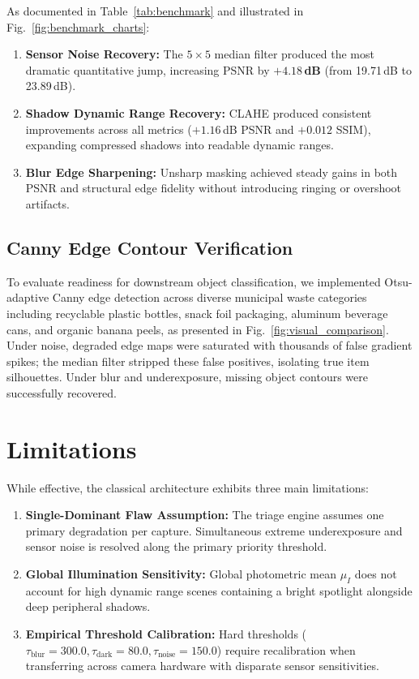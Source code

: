 \documentclass[conference]{IEEEtran}
\begin{document}
As documented in Table~\ref{tab:benchmark} and illustrated in Fig.~\ref{fig:benchmark_charts}:
\begin{enumerate}
    \item \textbf{Sensor Noise Recovery:} The $5 \times 5$ median filter produced the most dramatic quantitative jump, increasing PSNR by \textbf{$+4.18$\,dB} (from 19.71\,dB to 23.89\,dB).
    \item \textbf{Shadow Dynamic Range Recovery:} CLAHE produced consistent improvements across all metrics ($+1.16$\,dB PSNR and $+0.012$ SSIM), expanding compressed shadows into readable dynamic ranges.
    \item \textbf{Blur Edge Sharpening:} Unsharp masking achieved steady gains in both PSNR and structural edge fidelity without introducing ringing or overshoot artifacts.
\end{enumerate}

\subsection{Canny Edge Contour Verification}
To evaluate readiness for downstream object classification, we implemented Otsu-adaptive Canny edge detection across diverse municipal waste categories including recyclable plastic bottles, snack foil packaging, aluminum beverage cans, and organic banana peels, as presented in Fig.~\ref{fig:visual_comparison}. Under noise, degraded edge maps were saturated with thousands of false gradient spikes; the median filter stripped these false positives, isolating true item silhouettes. Under blur and underexposure, missing object contours were successfully recovered.

\section{Limitations}
While effective, the classical architecture exhibits three main limitations:
\begin{enumerate}
    \item \textbf{Single-Dominant Flaw Assumption:} The triage engine assumes one primary degradation per capture. Simultaneous extreme underexposure and sensor noise is resolved along the primary priority threshold.
    \item \textbf{Global Illumination Sensitivity:} Global photometric mean $\mu_I$ does not account for high dynamic range scenes containing a bright spotlight alongside deep peripheral shadows.
    \item \textbf{Empirical Threshold Calibration:} Hard thresholds ($\tau_{\text{blur}}=300.0, \tau_{\text{dark}}=80.0, \tau_{\text{noise}}=150.0$) require recalibration when transferring across camera hardware with disparate sensor sensitivities.
\end{enumerate}
\end{document}
